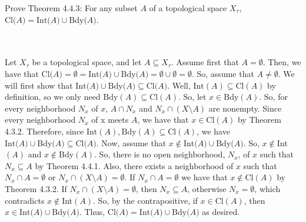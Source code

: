 Prove Theorem 4.4.3: For any subset $A$ of a topological space $X_{\tau}$,\\
$\text{Cl($A$)}=\text{Int($A$)}\cup\text{Bdy($A$)}$.\\\\

\begin{solution}\renewcommand{\qedsymbol}{}\ \\
    Let $X_{\tau}$ be a topological space, and let $A\subseteq X_{\tau}$. Assume first that
    $A=\emptyset$. Then, we have that
    $\text{Cl($A$)}=\emptyset=\text{Int($A$)}\cup\text{Bdy($A$)}=\emptyset\cup\emptyset=\emptyset$.
    So, assume that $A\neq\emptyset$. We will first show that
    $\text{Int($A$)}\cup\text{Bdy($A$)}\subseteq\text{Cl($A$)}$. Well,
    $\text{Int}(A)\subseteq\text{Cl}(A)$ by definition, so we only need
    $\text{Bdy}(A)\subseteq\text{Cl}(A)$. So, let $x\in\text{Bdy}(A)$. So, for every neighborhood $N_x$
    of $x$, $A\cap N_x$ and $N_x\cap(X\setminus A)$ are nonempty. Since every neighborhood $N_x$ of x
    meets $A$, we have that $x\in\text{Cl}(A)$ by Theorem 4.3.2. Therefore, since
    $\text{Int}(A), \text{Bdy}(A)\subseteq\text{Cl}(A)$, we have
    $\text{Int($A$)}\cup\text{Bdy($A$)}\subseteq\text{Cl($A$)}$. Now, assume that
    $x\notin\text{Int($A$)}\cup\text{Bdy($A$)}$. So, $x\notin$Int$(A)$ and $x\notin$Bdy$(A)$. So, there
    is no open neighborhood, $N_x$, of $x$ such that $N_x\subseteq A$ by Theorem 4.4.1. Also, there
    exists a neighborhood of $x$ such that $N_x\cap A=\emptyset$ or $N_x\cap(X\setminus A)=\emptyset$.
    If $N_x\cap A=\emptyset$ we have that $x\notin$Cl$(A)$ by Theorem 4.3.2. If
    $N_x\cap(X\setminus A)=\emptyset$, then $N_x\subseteq A$, otherwise $N_x=\emptyset$, which
    contradicts $x\notin$Int$(A)$. So, by the contrapositive, if $x\in$Cl$(A)$, then
    $x\in\text{Int($A$)}\cup\text{Bdy($A$)}$. Thus, $\text{Cl($A$)}=\text{Int($A$)}\cup\text{Bdy($A$)}$
    as desired.

\end{solution}